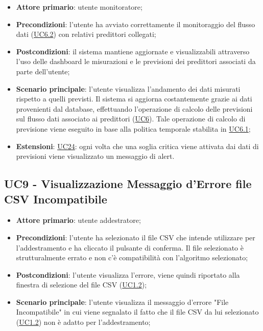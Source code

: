 		\begin{itemize}
			\item\textbf{Attore primario}: utente monitoratore;
			\item\textbf{Precondizioni}: l’utente ha avviato correttamente il monitoraggio del flusso dati (\hyperref[par:UC6.2]{UC6.2}) con relativi predittori collegati;
			\item\textbf{Postcondizioni}: il sistema mantiene aggiornate e visualizzabili attraverso l’uso delle dashboard le misurazioni e le previsioni dei predittori associati da parte dell’utente;
			\item\textbf{Scenario principale}: l’utente visualizza l’andamento dei dati misurati rispetto a quelli previsti. Il sistema si aggiorna costantemente grazie ai dati provenienti dal database, effettuando l’operazione di calcolo delle previsioni sul flusso dati associato ai predittori (\hyperref[par:UC6]{UC6}). Tale operazione di calcolo di previsione viene eseguito in base alla politica temporale stabilita in \hyperref[par:UC6.1]{UC6.1};		
			\item\textbf{Estensioni}: \hyperref[par:UC24]{UC24}: ogni volta che una soglia critica viene attivata dai dati di previsioni viene visualizzato un messaggio di alert.
		\end{itemize}

	
	\label{par:UC9}
	\subsection{UC9 - Visualizzazione Messaggio d'Errore file CSV Incompatibile}
		\begin{itemize}
			\item\textbf{Attore primario}: utente addestratore;
			\item\textbf{Precondizioni}: l’utente ha selezionato il file CSV che intende utilizzare per l'addestramento e ha cliccato il pulsante di conferma. Il file selezionato è strutturalmente errato e non c'è compatibilità con l'algoritmo selezionato;
			\item\textbf{Postcondizioni}: l'utente visualizza l'errore, viene quindi riportato alla finestra di selezione del file CSV (\hyperref[par:UC1.2]{UC1.2});
			\item\textbf{Scenario principale}: l’utente visualizza il messaggio d'errore "File Incompatibile" in cui viene segnalato il fatto che il file CSV da lui selezionato (\hyperref[par:UC1.2]{UC1.2}) non è adatto per l'addestramento; 		
		\end{itemize}


